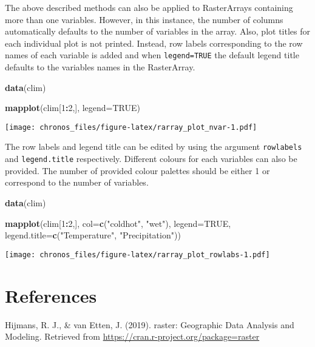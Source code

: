 \documentclass[]{article}
\newenvironment{Shaded}{\begin{snugshade}}{\end{snugshade}}
\newcommand{\KeywordTok}[1]{\textcolor[rgb]{0.13,0.29,0.53}{\textbf{#1}}}
\newcommand{\DataTypeTok}[1]{\textcolor[rgb]{0.13,0.29,0.53}{#1}}
\newcommand{\DecValTok}[1]{\textcolor[rgb]{0.00,0.00,0.81}{#1}}
\newcommand{\StringTok}[1]{\textcolor[rgb]{0.31,0.60,0.02}{#1}}
\newcommand{\OtherTok}[1]{\textcolor[rgb]{0.56,0.35,0.01}{#1}}
\newcommand{\OperatorTok}[1]{\textcolor[rgb]{0.81,0.36,0.00}{\textbf{#1}}}
\newcommand{\NormalTok}[1]{#1}
\begin{document}
The above described methods can also be applied to RasterArrays
containing more than one variables. However, in this instance, the
number of columns automatically defaults to the number of variables in
the array. Also, plot titles for each individual plot is not printed.
Instead, row labels corresponding to the row names of each variable is
added and when \texttt{legend=TRUE} the default legend title defaults to
the variables names in the RasterArray.

\begin{Shaded}
\begin{Highlighting}[]
\KeywordTok{data}\NormalTok{(clim)}

\KeywordTok{mapplot}\NormalTok{(clim[}\DecValTok{1}\OperatorTok{:}\DecValTok{2}\NormalTok{,], }\DataTypeTok{legend=}\OtherTok{TRUE}\NormalTok{)}
\end{Highlighting}
\end{Shaded}

\texttt{[image: chronos\_files/figure-latex/rarray\_plot\_nvar-1.pdf]}

The row labels and legend title can be edited by using the argument
\texttt{rowlabels} and \texttt{legend.title} respectively. Different
colours for each variables can also be provided. The number of provided
colour palettes should be either 1 or correspond to the number of
variables.

\begin{Shaded}
\begin{Highlighting}[]
\KeywordTok{data}\NormalTok{(clim)}

\KeywordTok{mapplot}\NormalTok{(clim[}\DecValTok{1}\OperatorTok{:}\DecValTok{2}\NormalTok{,], }\DataTypeTok{col=}\KeywordTok{c}\NormalTok{(}\StringTok{"coldhot"}\NormalTok{, }\StringTok{"wet"}\NormalTok{), }
        \DataTypeTok{legend=}\OtherTok{TRUE}\NormalTok{, }\DataTypeTok{legend.title=}\KeywordTok{c}\NormalTok{(}\StringTok{"Temperature"}\NormalTok{, }\StringTok{"Precipitation"}\NormalTok{))}
\end{Highlighting}
\end{Shaded}

\texttt{[image: chronos\_files/figure-latex/rarray\_plot\_rowlabs-1.pdf]}

\section{References}\label{references}

Hijmans, R. J., \& van Etten, J. (2019). raster: Geographic Data
Analysis and Modeling. Retrieved from
\url{https://cran.r-project.org/package=raster}
\end{document}
